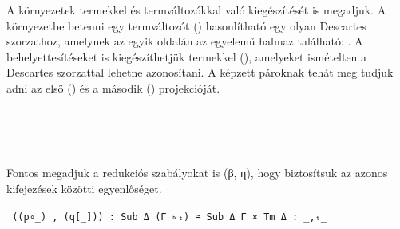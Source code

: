 A környezetek termekkel és termváltozókkal való kiegészítését is megadjuk. A környezetbe betenni egy termváltozót () hasonlítható egy olyan Descartes szorzathoz, amelynek az egyik oldalán az egyelemű halmaz található: . A behelyettesítéseket is kiegészíthetjük termekkel (), amelyeket ismételten a Descartes szorzattal lehetne azonosítani. A képzett pároknak tehát meg tudjuk adni az első () és a második () projekcióját.
\begin{code}%
%
\>[6]%
\>[12]\AgdaSymbol{:}\AgdaSpace{}%
\AgdaSpace{}%
\AgdaSpace{}%
\<%
\\
%
\>[6]%
\>[12]\AgdaSymbol{:}\AgdaSpace{}%
\AgdaSpace{}%
\AgdaSymbol{\}}\AgdaSpace{}%
\AgdaSpace{}%
\AgdaSpace{}%
\AgdaSpace{}%
\AgdaSpace{}%
\AgdaSpace{}%
\AgdaSpace{}%
\AgdaSpace{}%
\AgdaSpace{}%
\AgdaSpace{}%
\AgdaSpace{}%
\AgdaSymbol{(}\AgdaSpace{}%
\AgdaSymbol{)}\<%
\\
%
\>[6]%
\>[12]\AgdaSymbol{:}\AgdaSpace{}%
\AgdaSymbol{\}}\AgdaSpace{}%
\AgdaSpace{}%
\AgdaSpace{}%
\AgdaSymbol{(}\AgdaSpace{}%
\AgdaSymbol{)}\AgdaSpace{}%
\<%
\\
%
\>[6]%
\>[12]\AgdaSymbol{:}\AgdaSpace{}%
\AgdaSymbol{\}}\AgdaSpace{}%
\AgdaSpace{}%
\AgdaSpace{}%
\AgdaSymbol{(}\AgdaSpace{}%
\AgdaSymbol{)}\<%
\end{code}

Fontos megadjuk a redukciós szabályokat is (β, η), hogy biztosítsuk az azonos kifejezések közötti egyenlőséget.

\texttt{
((p∘\_) , (q[\_])) : Sub Δ (Γ ▹ₜ) ≅ Sub Δ Γ × Tm Δ : \_,ₜ\_
}

